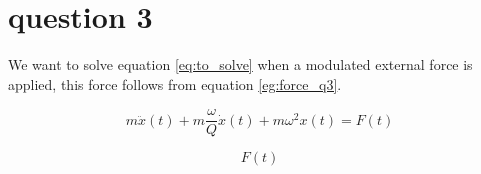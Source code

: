 \section{question 3}
We want to solve equation \ref{eq:to_solve} when a modulated external force is applied, this force follows from equation \ref{eg:force_q3}.

\begin{equation}
    m \ddot{x}(t)+m\frac{\omega}{Q}\dot{x}(t)+m \omega^2 x(t) = F(t)
    \label{eq:to_solve}
\end{equation}

\begin{equation}
    F(t)
    \label{eq:force_q3}
\end{equation}